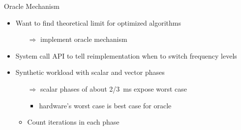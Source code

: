 \begin{frame}[t]{Oracle Mechanism}
	\begin{itemize}
		\item Want to find theoretical limit for optimized algorithms
		\begin{itemize}
			\item[$\Rightarrow$] implement oracle mechanism
		\end{itemize}
		\item System call API to tell reimplementation when to switch frequency levels
		\item Synthetic workload with scalar and vector phases
		\begin{itemize}
			\item[$\Rightarrow$] scalar phases of about \SI[quotient-mode=fraction]{2/3}{\milli\second} expose worst case
			\begin{itemize}
				\item hardware's worst case is best case for oracle
			\end{itemize}
			\item Count iterations in each phase
		\end{itemize}
	\end{itemize}
\end{frame}